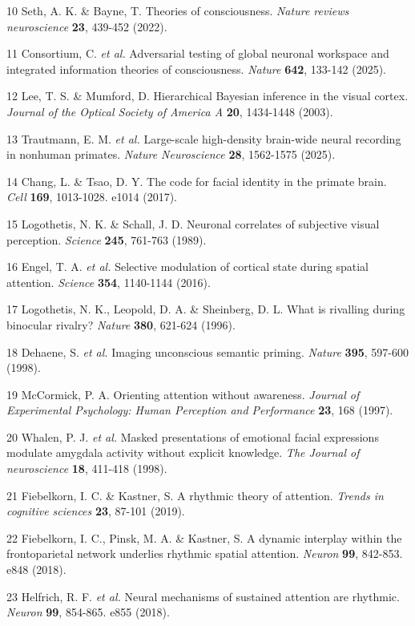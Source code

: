 \documentclass{article}
\begin{document}
\begin{hangpars}
10 Seth, A. K. \& Bayne, T. Theories of consciousness. \textit{Nature reviews neuroscience} \textbf{23}, 439-452 (2022).

11 Consortium, C. \textit{et al.} Adversarial testing of global neuronal workspace and integrated information theories of consciousness. \textit{Nature} \textbf{642}, 133-142 (2025).

12 Lee, T. S. \& Mumford, D. Hierarchical Bayesian inference in the visual cortex. \textit{Journal of the Optical Society of America A} \textbf{20}, 1434-1448 (2003).

13 Trautmann, E. M. \textit{et al.} Large-scale high-density brain-wide neural recording in nonhuman primates. \textit{Nature Neuroscience} \textbf{28}, 1562-1575 (2025).

14 Chang, L. \& Tsao, D. Y. The code for facial identity in the primate brain. \textit{Cell} \textbf{169}, 1013-1028. e1014 (2017).

15 Logothetis, N. K. \& Schall, J. D. Neuronal correlates of subjective visual perception. \textit{Science} \textbf{245}, 761-763 (1989).

16 Engel, T. A. \textit{et al.} Selective modulation of cortical state during spatial attention. \textit{Science} \textbf{354}, 1140-1144 (2016).

17 Logothetis, N. K., Leopold, D. A. \& Sheinberg, D. L. What is rivalling during binocular rivalry? \textit{Nature} \textbf{380}, 621-624 (1996).

18 Dehaene, S. \textit{et al.} Imaging unconscious semantic priming. \textit{Nature} \textbf{395}, 597-600 (1998).

19 McCormick, P. A. Orienting attention without awareness. \textit{Journal of Experimental Psychology: Human Perception and Performance} \textbf{23}, 168 (1997).

20 Whalen, P. J. \textit{et al.} Masked presentations of emotional facial expressions modulate amygdala activity without explicit knowledge. \textit{The Journal of neuroscience} \textbf{18}, 411-418 (1998).

21 Fiebelkorn, I. C. \& Kastner, S. A rhythmic theory of attention. \textit{Trends in cognitive sciences} \textbf{23}, 87-101 (2019).

22 Fiebelkorn, I. C., Pinsk, M. A. \& Kastner, S. A dynamic interplay within the frontoparietal network underlies rhythmic spatial attention. \textit{Neuron} \textbf{99}, 842-853. e848 (2018).

23 Helfrich, R. F. \textit{et al.} Neural mechanisms of sustained attention are rhythmic. \textit{Neuron} \textbf{99}, 854-865. e855 (2018).


\end{hangpars}
\end{document}
